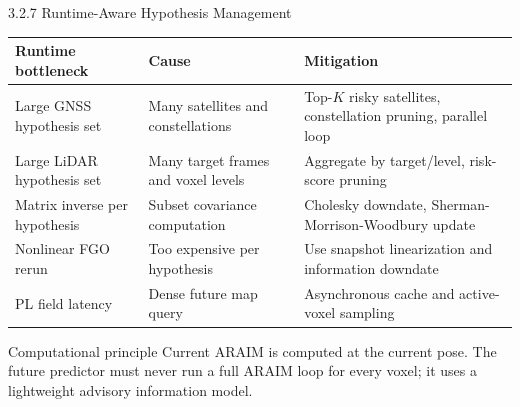 \documentclass[10pt,aspectratio=169,xcolor=dvipsnames]{beamer}
\begin{document}
\begin{frame}{3.2.7 Runtime-Aware Hypothesis Management}
  \small
  \begin{table}\scriptsize
    \begin{tabular}{p{} p{} p{}}
      \toprule
      \textbf{Runtime bottleneck} & \textbf{Cause} & \textbf{Mitigation}\\
      \midrule
      Large GNSS hypothesis set & Many satellites and constellations & Top-$K$ risky satellites, constellation pruning, parallel loop\\
      Large LiDAR hypothesis set & Many target frames and voxel levels & Aggregate by target/level, risk-score pruning\\
      Matrix inverse per hypothesis & Subset covariance computation & Cholesky downdate, Sherman-Morrison-Woodbury update\\
      Nonlinear FGO rerun & Too expensive per hypothesis & Use snapshot linearization and information downdate\\
      PL field latency & Dense future map query & Asynchronous cache and active-voxel sampling\\
      \bottomrule
    \end{tabular}
  \end{table}

  \begin{block}{Computational principle}
    \footnotesize Current ARAIM is computed at the current pose. The future predictor must never run a full ARAIM loop for every voxel; it uses a lightweight advisory information model.
  \end{block}
\end{frame}
\end{document}
